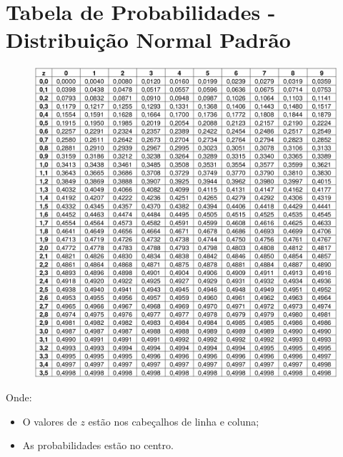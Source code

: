 \chapter{Tabela de Probabilidades - Distribuição Normal Padrão}

\begin{figure}[h]
	\center
	\label{fig:tab-prob-normal-padrao}
	\includegraphics[scale=2]{apendices/prob-normal-padrao.png}
\end{figure}

Onde:
\begin{itemize}
	\item O valores de \(z\) estão nos cabeçalhos de linha e coluna;
	\item As probabilidades estão no centro.
\end{itemize}

